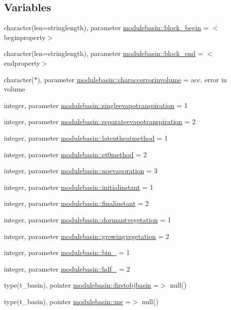 \subsection*{Variables}
\begin{DoxyCompactItemize}
\item 
character(len=stringlength), parameter \mbox{\hyperlink{namespacemodulebasin_a14ea3de5b477aa2d46ac8ce040ba891c}{modulebasin\+::block\+\_\+begin}} = \textquotesingle{}$<$beginproperty$>$\textquotesingle{}
\item 
character(len=stringlength), parameter \mbox{\hyperlink{namespacemodulebasin_a2dc5a4aaf15a73086781f37d625f774d}{modulebasin\+::block\+\_\+end}} = \textquotesingle{}$<$endproperty$>$\textquotesingle{}
\item 
character($\ast$), parameter \mbox{\hyperlink{namespacemodulebasin_a230ea75f89c595973578b0499383801d}{modulebasin\+::characcerrorinvolume}} = \textquotesingle{}acc. error in volume\textquotesingle{}
\item 
integer, parameter \mbox{\hyperlink{namespacemodulebasin_a2dcbd4e7d257d1f941396190dc70d0ff}{modulebasin\+::singleevapotranspiration}} = 1
\item 
integer, parameter \mbox{\hyperlink{namespacemodulebasin_a4b6df4471c430f67f989fae81f10890e}{modulebasin\+::separateevapotranspiration}} = 2
\item 
integer, parameter \mbox{\hyperlink{namespacemodulebasin_aa7e35827b82168f13e8ecdcc1bf6617f}{modulebasin\+::latentheatmethod}} = 1
\item 
integer, parameter \mbox{\hyperlink{namespacemodulebasin_a173aa2ad8e4e632e6cb9251e98c97e5d}{modulebasin\+::et0method}} = 2
\item 
integer, parameter \mbox{\hyperlink{namespacemodulebasin_af088e3a549c4287fe37268c7b797009a}{modulebasin\+::noevaporation}} = 3
\item 
integer, parameter \mbox{\hyperlink{namespacemodulebasin_a08406908915d785e95593b3fac62eba2}{modulebasin\+::initialinstant}} = 1
\item 
integer, parameter \mbox{\hyperlink{namespacemodulebasin_ab601fa0c07f0bc9134f81f45d1341678}{modulebasin\+::finalinstant}} = 2
\item 
integer, parameter \mbox{\hyperlink{namespacemodulebasin_a07f6f68a43c452ae9eef45c1933a1d20}{modulebasin\+::dormantvegetation}} = 1
\item 
integer, parameter \mbox{\hyperlink{namespacemodulebasin_a2def264a3397d7af9334938fcadc85a1}{modulebasin\+::growingvegetation}} = 2
\item 
integer, parameter \mbox{\hyperlink{namespacemodulebasin_ab9e149429872bd1ef4a8213cff258870}{modulebasin\+::bin\+\_\+}} = 1
\item 
integer, parameter \mbox{\hyperlink{namespacemodulebasin_adfc7cbd6f69b8542c190e4a6c26df03d}{modulebasin\+::hdf\+\_\+}} = 2
\item 
type(t\+\_\+basin), pointer \mbox{\hyperlink{namespacemodulebasin_a5b7e2b3f3d81ecb78131059c79f1557e}{modulebasin\+::firstobjbasin}} =$>$ null()
\item 
type(t\+\_\+basin), pointer \mbox{\hyperlink{namespacemodulebasin_ac2c2d1c0a2e6ccb0d5e821368192a807}{modulebasin\+::me}} =$>$ null()
\end{DoxyCompactItemize}
